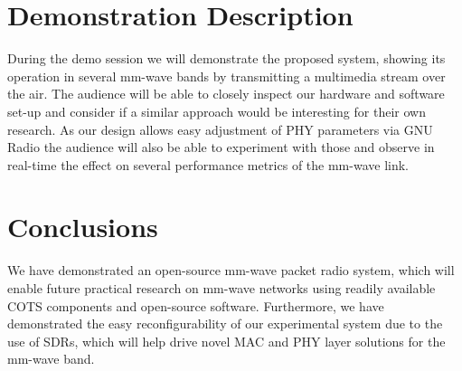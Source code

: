 \documentclass{sig-alternate}
\begin{document}
\section{Demonstration Description} 
During the demo session we will demonstrate the proposed system, showing its operation in several mm-wave bands by transmitting a multimedia stream over the air. %
The audience will be able to closely inspect our hardware and software set-up and consider if a similar approach would be interesting for their own research. %
As our design allows easy adjustment of PHY parameters via GNU Radio the audience will also be able to experiment with those %
and observe  in real-time the effect on several performance metrics of the mm-wave link.


\section{Conclusions}
We have demonstrated an open-source mm-wave packet radio system, which will enable future practical research on mm-wave networks using readily available COTS components and open-source software. Furthermore, we have demonstrated the easy reconfigurability of our experimental system due to the use of SDRs, which will help drive novel MAC and PHY layer solutions for the mm-wave band.




\balancecolumns
\end{document}
